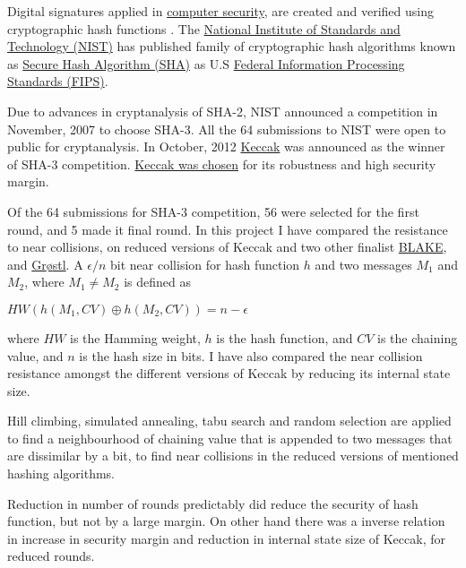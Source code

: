 \begin{abstractpage}

Digital signatures applied in \href{"http://en.wikipedia.org/wiki/Cryptographic\_hash\_function\#Applications"}
{computer security}, are created and verified using cryptographic hash functions \cite{00042}.
The \href{"http://www.nist.gov/index.html"}{National Institute of Standards and Technology (NIST)} has published
family of cryptographic hash algorithms known as \href{http://en.wikipedia.org/wiki/Secure_Hash_Algorithm}
{Secure Hash Algorithm (SHA)} as U.S \href{http://en.wikipedia.org/wiki/Federal_Information_Processing_Standard}
{Federal Information Processing Standards (FIPS)}.

Due to advances in cryptanalysis of SHA-2, NIST announced a competition in November, 2007 to choose SHA-3. 
All the 64 submissions to NIST were open to public for cryptanalysis. 
In October, 2012 \href{"http://keccak.noekeon.org/"}{Keccak} was announced as the winner of SHA-3 competition. 
\href{"http://csrc.nist.gov/groups/ST/hash/sha-3/sha-3\_selection\_announcement.pdf"}{Keccak was chosen}
for its robustness and high security margin.

Of the 64 submissions for SHA-3 competition, 56 were selected for the first round, and 5 made it final round.
In this project I have compared the resistance to near collisions, on reduced versions of Keccak and two other
finalist \href{"https://131002.net/blake/"}{BLAKE}, and \href{"http://www.groestl.info/"}{Gr{\o}stl}. 
A $\epsilon / n $ bit near collision for hash function $h$ and two messages $M_{1}$ and $M_{2}$, where
$M_{1} \neq M_{2}$ is defined as
\begin{center}$HW( h( M_{1}, CV ) \oplus h( M_{2}, CV ) ) = n - \epsilon $\end{center}
where $HW$ is the Hamming weight, $h$ is the hash function, and $CV$ is the chaining value, and $n$ is the hash 
size in bits. I have also compared the near collision resistance amongst the different versions of Keccak by 
reducing its internal state size.

Hill climbing, simulated annealing, tabu search and random selection are applied to find a neighbourhood of chaining
value that is appended to two messages that are dissimilar by a bit, to find near collisions in the reduced versions 
of mentioned hashing algorithms.

Reduction in number of rounds predictably did reduce the security of hash function, but not by a large margin.
On other hand there was a inverse relation in increase in security margin and reduction in internal state size
of Keccak, for reduced rounds.
  
\end{abstractpage}
